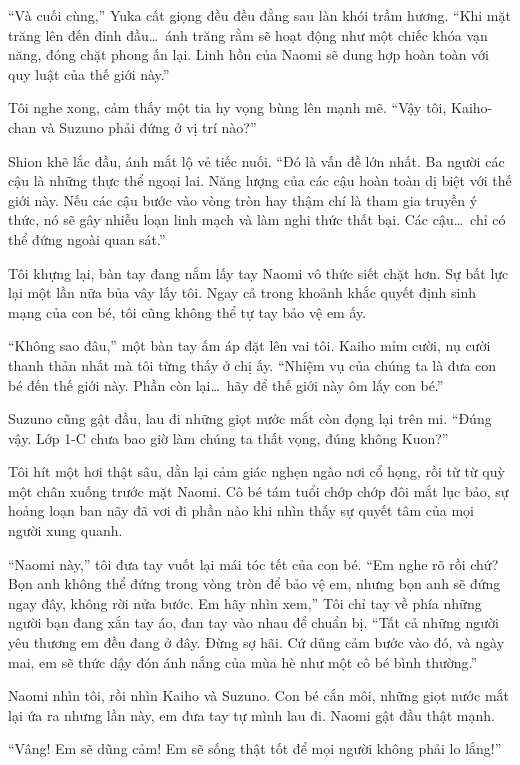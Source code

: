 \documentclass[../main.tex]{subfiles}
\begin{document}
``Và cuối cùng,'' Yuka cất giọng đều đều đằng sau làn khói trầm hương. ``Khi mặt trăng lên đến đỉnh đầu\dots\ ánh trăng rằm sẽ hoạt động như một chiếc khóa vạn năng, đóng chặt phong ấn lại. Linh hồn của Naomi sẽ dung hợp hoàn toàn với quy luật của thế giới này.''

Tôi nghe xong, cảm thấy một tia hy vọng bùng lên mạnh mẽ. ``Vậy tôi, Kaiho-chan và Suzuno phải đứng ở vị trí nào?''

Shion khẽ lắc đầu, ánh mắt lộ vẻ tiếc nuối. ``Đó là vấn đề lớn nhất. Ba người các cậu là những thực thể ngoại lai. Năng lượng của các cậu hoàn toàn dị biệt với thế giới này. Nếu các cậu bước vào vòng tròn hay thậm chí là tham gia truyền ý thức, nó sẽ gây nhiễu loạn linh mạch và làm nghi thức thất bại. Các cậu\dots\ chỉ có thể đứng ngoài quan sát.''

Tôi khựng lại, bàn tay đang nắm lấy tay Naomi vô thức siết chặt hơn. Sự bất lực lại một lần nữa bủa vây lấy tôi. Ngay cả trong khoảnh khắc quyết định sinh mạng của con bé, tôi cũng không thể tự tay bảo vệ em ấy.

``Không sao đâu,'' một bàn tay ấm áp đặt lên vai tôi. Kaiho mỉm cười, nụ cười thanh thản nhất mà tôi từng thấy ở chị ấy. ``Nhiệm vụ của chúng ta là đưa con bé đến thế giới này. Phần còn lại\dots\ hãy để thế giới này ôm lấy con bé.''

Suzuno cũng gật đầu, lau đi những giọt nước mắt còn đọng lại trên mi. ``Đúng vậy. Lớp 1-C chưa bao giờ làm chúng ta thất vọng, đúng không Kuon?''

Tôi hít một hơi thật sâu, dằn lại cảm giác nghẹn ngào nơi cổ họng, rồi từ từ quỳ một chân xuống trước mặt Naomi. Cô bé tám tuổi chớp chớp đôi mắt lục bảo, sự hoảng loạn ban nãy đã vơi đi phần nào khi nhìn thấy sự quyết tâm của mọi người xung quanh.

``Naomi này,'' tôi đưa tay vuốt lại mái tóc tết của con bé. ``Em nghe rõ rồi chứ? Bọn anh không thể đứng trong vòng tròn để bảo vệ em, nhưng bọn anh sẽ đứng ngay đây, không rời nửa bước. Em hãy nhìn xem,'' Tôi chỉ tay về phía những người bạn đang xắn tay áo, đan tay vào nhau để chuẩn bị. ``Tất cả những người yêu thương em đều đang ở đây. Đừng sợ hãi. Cứ dũng cảm bước vào đó, và ngày mai, em sẽ thức dậy đón ánh nắng của mùa hè như một cô bé bình thường.''

Naomi nhìn tôi, rồi nhìn Kaiho và Suzuno. Con bé cắn môi, những giọt nước mắt lại ứa ra nhưng lần này, em đưa tay tự mình lau đi. Naomi gật đầu thật mạnh.

``Vâng! Em sẽ dũng cảm! Em sẽ sống thật tốt để mọi người không phải lo lắng!''
\end{document}

